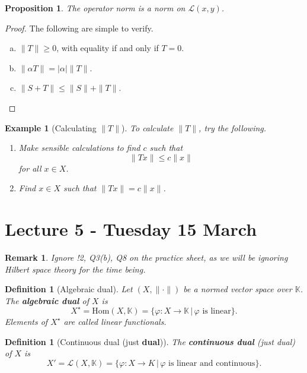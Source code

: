 \documentclass[12pt, oneside, a4paper]{article}
\newtheorem{prop}[thm]{Proposition}
\theoremstyle{dfn}
\newtheorem{dfn}[thm]{Definition}
\newtheorem{rem}[thm]{Remark}
\newtheorem{ex}[thm]{Example}
\renewcommand{\phi}{\varphi}
\newcommand{\K}{\mathbb{K}}
\begin{document}
\begin{prop}
    The operator norm is a norm on $\mathcal{L}(x,y)$.  
\end{prop}

\begin{proof}  The following are simple to verify.
    \begin{enumerate}[(a)]
        \item $\| T \| \geq 0$, with equality if and only if $ T = 0$. 
        \item $\| \alpha T \| = | \alpha | \|T \|$.
        \item $\| S + T \| \leq  \| S \| + \| T \|$.
    \end{enumerate}
\end{proof}

\begin{ex}[Calculating $\| T \|$]
    To calculate $\| T \|$, try the following. 
    \begin{enumerate}[1)]
        \item Make sensible calculations to find $c$ such that \[
            \| Tx \| \leq c \| x \|
        \] for all $x \in X$.
        \item Find $x \in X$ such that $\|Tx \| = c \| x \|$.
    \end{enumerate}
\end{ex}

\section{Lecture 5 - Tuesday 15 March} %
\label{sec:lecture_5_tusday_15_march}
\begin{rem}
    Ignore !2, Q3(b), Q8 on the practice sheet, as we will be ignoring Hilbert space theory for the time being.
\end{rem}

\begin{dfn}[Algebraic dual]
    Let $(X, \| \cdot \|)$ be a normed vector space over $\K$.  The \textbf{algebraic dual} of $X$ is \[
        X^\star = \text{Hom}(X, \K) = \{ \phi: X \rightarrow \K \, | \, \text{$\phi$ is linear} \}.
    \]  Elements of $X^\star$ are called linear functionals.
\end{dfn}

\begin{dfn}[Continuous dual (just \textbf{dual})]
    The \textbf{continuous dual} (just dual) of $X$ is \[
        X' = \mathcal{L}(X, \K) = \{ \phi : X \rightarrow K \, | \, \text{$\phi$ is linear and continuous} \}.
    \]
\end{dfn}
\end{document}
